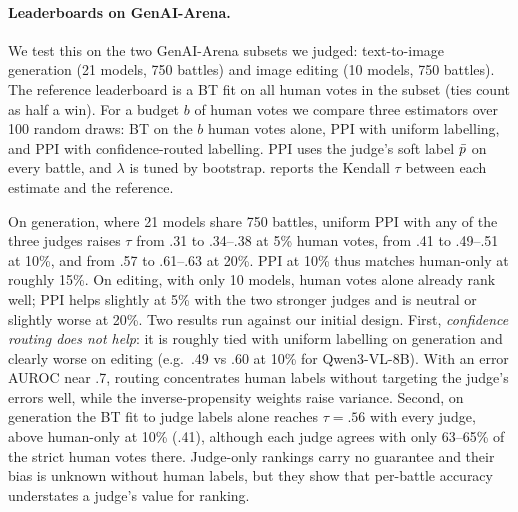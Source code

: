\paragraph{Leaderboards on GenAI-Arena.}
We test this on the two GenAI-Arena subsets we judged: text-to-image generation (21 models, 750 battles) and image editing (10 models, 750 battles). The reference leaderboard is a BT fit on all human votes in the subset (ties count as half a win).
For a budget $b$ of human votes we compare three estimators over 100 random draws: BT on the $b$ human votes alone, PPI with uniform labelling, and PPI with confidence-routed labelling. PPI uses the judge's soft label $\bar p$ on every battle, and $\lambda$ is tuned by bootstrap.
 reports the Kendall $\tau$ between each estimate and the reference.
\begin{table}[t]
\centering\small
\caption{GenAI-Arena leaderboards: Kendall $\tau$ to the all-votes reference ranking (mean over 100 draws; $K$ = number of models). ``Judge only'' fits BT to judge soft labels alone and has no validity guarantee. PPI-r: confidence-routed labelling.}\label{tab:ppi}

\end{table}
On generation, where 21 models share 750 battles, uniform PPI with any of the three judges raises $\tau$ from .31 to .34--.38 at 5\% human votes, from .41 to .49--.51 at 10\%, and from .57 to .61--.63 at 20\%. PPI at 10\% thus matches human-only at roughly 15\%.
On editing, with only 10 models, human votes alone already rank well; PPI helps slightly at 5\% with the two stronger judges and is neutral or slightly worse at 20\%.
Two results run against our initial design.
First, \emph{confidence routing does not help}: it is roughly tied with uniform labelling on generation and clearly worse on editing (e.g.\ .49 vs .60 at 10\% for Qwen3-VL-8B). With an error AUROC near .7, routing concentrates human labels without targeting the judge's errors well, while the inverse-propensity weights raise variance.
Second, on generation the BT fit to judge labels alone reaches $\tau=.56$ with every judge, above human-only at 10\% (.41), although each judge agrees with only 63--65\% of the strict human votes there. Judge-only rankings carry no guarantee and their bias is unknown without human labels, but they show that per-battle accuracy understates a judge's value for ranking.
